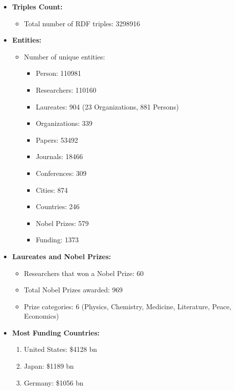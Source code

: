 \documentclass{article}
\begin{document}
\begin{itemize}
	\item	\textbf{Triples Count:}
				\begin{itemize}
				\item Total number of RDF triples: 3298916
				\end{itemize}
	\item	\textbf{Entities:}
				\begin{itemize}
		      	\item Number of unique entities:
		            \begin{itemize}
			            \item Person: 110981
			            \item Researchers: 110160
			            \item Laureates: 904 (23 Organizations, 881 Persons)
			            \item Organizations: 339
			            \item Papers: 53492
			            \item Journals: 18466
			            \item Conferences: 309
			            \item Cities: 874
			            \item Countries: 246
			            \item Nobel Prizes: 579
			            \item Funding: 1373
		            \end{itemize}
				\end{itemize}

	\item \textbf{Laureates and Nobel Prizes:}
	      \begin{itemize}
		      \item Researchers that won a Nobel Prize: 60
		      \item Total Nobel Prizes awarded: 969
		      \item Prize categories: 6 (Physics, Chemistry, Medicine, Literature, Peace, Economics)
	      \end{itemize}
	\item \textbf{Most Funding Countries: }
		\begin{enumerate}
			\item United States: \$4128 bn
			\item Japan: \$1189 bn
			\item Germany: \$1056 bn
		\end{enumerate}
	
\end{itemize}
\end{document}
